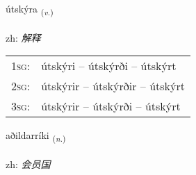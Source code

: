 \documentclass[frontgrid, backgrid]{flacards}\usepackage[]{graphicx}\usepackage[]{color}
\begin{document}
\renewcommand{\flhead}{\vskip5pt \fboxsep=0pt {\small\bfseries\footnotesize Sagnorð | 动词}}
\renewcommand{\fcfoot}{\vskip5pt \fboxsep=0pt \hspace{2pt}{\small\bfseries\footnotesize 2K}}

\renewcommand{\blhead}{\vskip5pt {\small\bfseries\footnotesize Sagnorð | 动词 }}
\renewcommand{\bcfoot}{\vskip5pt \hspace{2pt}{\small\bfseries\footnotesize 2K}}


{útskýra \small{\textsubscript{(\textit{v.})}} \\[1ex] %
\textphonetic{[uːtscira]} \\
zh: \emph{解释} \\  [2ex]
\renewcommand*{\arraystretch}{0.8}
\begin{tabular}{p{1cm}l}
\textsc{1sg}: & útskýri -- útskýrði -- útskýrt \\ 
\textsc{2sg}: & útskýrir -- útskýrðir -- útskýrt \\ 
\textsc{3sg}: & útskýrir -- útskýrði -- útskýrt \\ 
\end{tabular}
}

\renewcommand{\flhead}{\vskip5pt \fboxsep=0pt {\small\bfseries\footnotesize Nafnorð | 名词}}
\renewcommand{\fcfoot}{\vskip5pt \fboxsep=0pt \hspace{2pt}{\small\bfseries\footnotesize 2K}}

\renewcommand{\blhead}{\vskip5pt {\small\bfseries\footnotesize Nafnorð | 名词 }}
\renewcommand{\bcfoot}{\vskip5pt \hspace{2pt}{\small\bfseries\footnotesize 2K}}


{aðildarríki \small{\textsubscript{(\textit{n.})}} \\[1ex] %
\textphonetic{[aːðɪltaricɪ]} \\
zh: \emph{会员国} \\  [2ex]
\renewcommand*{\arraystretch}{0.8}
}
\end{document}
